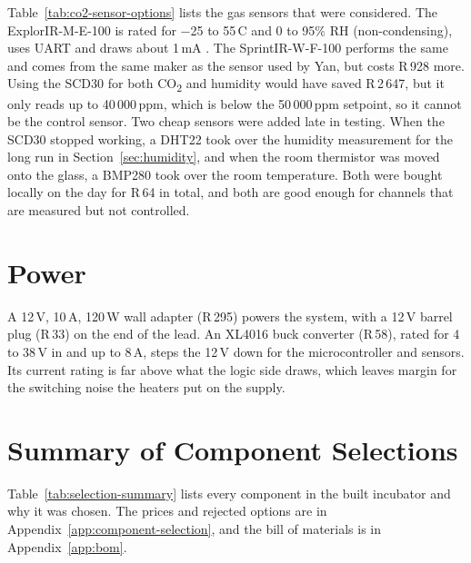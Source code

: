 Table~\ref{tab:co2-sensor-options} lists the gas sensors that were considered. The ExplorIR-M-E-100 is rated for $-$25 to 55\,\textdegree{}C and 0 to 95\% RH (non-condensing), uses UART and draws about 1\,mA \citep{gss_explorir_2021}. The SprintIR-W-F-100 performs the same and comes from the same maker as the sensor used by Yan, but costs R\,928 more. Using the SCD30 for both CO\textsubscript{2} and humidity would have saved R\,2\,647, but it only reads up to 40\,000\,ppm, which is below the 50\,000\,ppm setpoint, so it cannot be the control sensor. Two cheap sensors were added late in testing. When the SCD30 stopped working, a DHT22 took over the humidity measurement for the long run in Section~\ref{sec:humidity}, and when the room thermistor was moved onto the glass, a BMP280 took over the room temperature. Both were bought locally on the day for R\,64 in total, and both are good enough for channels that are measured but not controlled.

\section{Power}
\label{app:power-options}

A 12\,V, 10\,A, 120\,W wall adapter (R\,295) powers the system, with a 12\,V barrel plug (R\,33) on the end of the lead. An XL4016 buck converter (R\,58), rated for 4 to 38\,V in and up to 8\,A, steps the 12\,V down for the microcontroller and sensors. Its current rating is far above what the logic side draws, which leaves margin for the switching noise the heaters put on the supply.

\section{Summary of Component Selections}
\label{app:selection-summary}

Table~\ref{tab:selection-summary} lists every component in the built incubator and why it was chosen. The prices and rejected options are in Appendix~\ref{app:component-selection}, and the bill of materials is in Appendix~\ref{app:bom}.

